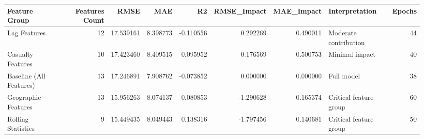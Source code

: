 \begin{tabular}{lrrrrrrlr}
\toprule
Feature Group & Features Count & RMSE & MAE & R2 & RMSE_Impact & MAE_Impact & Interpretation & Epochs \\
\midrule
Lag Features & 12 & 17.539161 & 8.398773 & -0.110556 & 0.292269 & 0.490011 & Moderate contribution & 44 \\
Casualty Features & 10 & 17.423460 & 8.409515 & -0.095952 & 0.176569 & 0.500753 & Minimal impact & 40 \\
Baseline (All Features) & 13 & 17.246891 & 7.908762 & -0.073852 & 0.000000 & 0.000000 & Full model & 38 \\
Geographic Features & 13 & 15.956263 & 8.074137 & 0.080853 & -1.290628 & 0.165374 & Critical feature group & 60 \\
Rolling Statistics & 9 & 15.449435 & 8.049443 & 0.138316 & -1.797456 & 0.140681 & Critical feature group & 50 \\
\bottomrule
\end{tabular}
